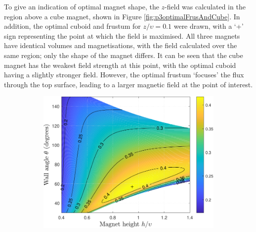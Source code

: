 To give an indication of optimal magnet shape, the \(z\)-field was calculated in the region above a cube magnet, shown in Figure \ref{fig:p3optimalFrusAndCube}. In addition, the optimal cuboid and frustum for \(z/\upsilon = 0.1\) were drawn, with a `+' sign representing the point at which the field is maximised. All three magnets have identical volumes and magnetisations, with the field calculated over the same region; only the shape of the magnet differs. It can be seen that the cube magnet has the weakest field strength at this point, with the optimal cuboid having a slightly stronger field. However, the optimal frustum `focuses' the flux through the top surface, leading to a larger magnetic field at the point of interest.
\begin{figure}
    \centering
	\begin{subfigure}{0.8\textwidth}
		\centering
		\includegraphics[width=\linewidth]{p3/p3FIG5a}
		\subcaption{}
		\label{subfig:p3centralField100}
	\end{subfigure}
	

\end{figure}
